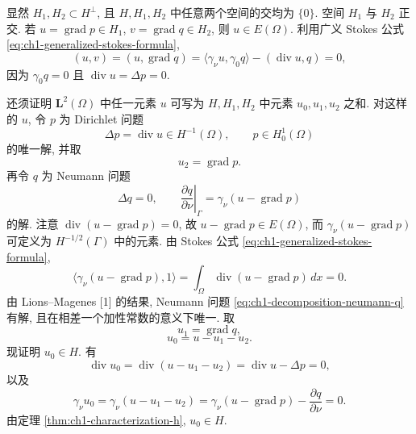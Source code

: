 \begin{Proof}
显然 $H_1,H_2\subset H^\perp$, 且 $H,H_1,H_2$ 中任意两个空间的交均为 $\{0\}$. 空间 $H_1$ 与 $H_2$ 正交. 若 $u=\operatorname{grad}p\in H_1$, $v=\operatorname{grad}q\in H_2$, 则 $u\in E(\Omega)$. 利用广义 Stokes 公式 \eqref{eq:ch1-generalized-stokes-formula},
\[
(u,v)=(u,\operatorname{grad}q)
=\langle\gamma_\nu u,\gamma_0q\rangle-(\operatorname{div}u,q)=0,
\]
因为 $\gamma_0q=0$ 且 $\operatorname{div}u=\Delta p=0$.

还须证明 $\mathbf L^2(\Omega)$ 中任一元素 $u$ 可写为 $H,H_1,H_2$ 中元素 $u_0,u_1,u_2$ 之和. 对这样的 $u$, 令 $p$ 为 Dirichlet 问题
\[
\Delta p=\operatorname{div}u\in H^{-1}(\Omega),
\qquad p\in H_0^1(\Omega)
\]
的唯一解, 并取
\begin{equation}
u_2=\operatorname{grad}p.
\label{eq:ch1-decomposition-u2}
\end{equation}
再令 $q$ 为 Neumann 问题
\begin{equation}
\Delta q=0,
\qquad\left.\frac{\partial q}{\partial\nu}\right|_\Gamma
=\gamma_\nu(u-\operatorname{grad}p)
\label{eq:ch1-decomposition-neumann-q}
\end{equation}
的解. 注意 $\operatorname{div}(u-\operatorname{grad}p)=0$, 故 $u-\operatorname{grad}p\in E(\Omega)$, 而 $\gamma_\nu(u-\operatorname{grad}p)$ 可定义为 $H^{-1/2}(\Gamma)$ 中的元素. 由 Stokes 公式 \eqref{eq:ch1-generalized-stokes-formula},
\[
\langle\gamma_\nu(u-\operatorname{grad}p),1\rangle
=\int_\Omega\operatorname{div}(u-\operatorname{grad}p)\,dx=0.
\]
由 Lions--Magenes [1] 的结果, Neumann 问题 \eqref{eq:ch1-decomposition-neumann-q} 有解, 且在相差一个加性常数的意义下唯一. 取
\begin{equation}
u_1=\operatorname{grad}q,
\label{eq:ch1-decomposition-u1}
\end{equation}
\begin{equation}
u_0=u-u_1-u_2.
\label{eq:ch1-decomposition-u0}
\end{equation}
现证明 $u_0\in H$. 有
\[
\operatorname{div}u_0=\operatorname{div}(u-u_1-u_2)=\operatorname{div}u-\Delta p=0,
\]
以及
\[
\gamma_\nu u_0=\gamma_\nu(u-u_1-u_2)
=\gamma_\nu(u-\operatorname{grad}p)-\frac{\partial q}{\partial\nu}=0.
\]
由定理 \ref{thm:ch1-characterization-h}, $u_0\in H$.
\end{Proof}

